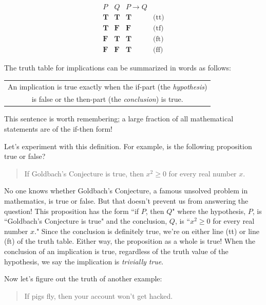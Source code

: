 \documentclass[11pt,oneside]{book}
\theoremstyle{definition}
\newcommand{\T}{\mathbf{T}}
\newcommand{\F}{\mathbf{F}}
\begin{document}
\[\begin{array}{c|c|cc}
    P & Q & P \rightarrow Q & \\
    \hline
    \T & \T & \T & \text{(tt)} \\
    \T & \F & \F & \text{(tf)} \\
    \F & \T & \T & \text{(ft)} \\
    \F & \F & \T & \text{(ff)}
\end{array}\]

The truth table for implications can be summarized in words as follows:

\begin{center}\begin{tabular}{|c|}
    \hline
    An implication is true exactly when the if-part (the \emph{hypothesis}) \\
    is false or the then-part (the \emph{conclusion}) is true. \\
    \hline
\end{tabular}\end{center}

This sentence is worth remembering; a large fraction of all mathematical statements are of the if-then form!

Let's experiment with this definition.
For example, is the following proposition true or false?

\begin{quote}
    If Goldbach's Conjecture is true, then $x^{2} \geq 0$ for every real number $x$.
\end{quote}

No one knows whether Goldbach's Conjecture, a famous unsolved problem in mathematics, is true or false.
But that doesn't prevent us from answering the question!
This proposition has the form ``if $P$, then $Q$" where the hypothesis, $P$, is ``Goldbach's Conjecture is true" and the conclusion, $Q$, is ``$x^{2} \geq 0$ for every real number $x$."
Since the conclusion is definitely true, we're on either line (tt) or line (ft) of the truth table.
Either way, the proposition as a whole is true!
When the conclusion of an implication is true, regardless of the truth value of the hypothesis, we say the implication is \emph{trivially true}.

Now let's figure out the truth of another example:

\begin{quote}
    If pigs fly, then your account won't get hacked.
\end{quote}
\end{document}
